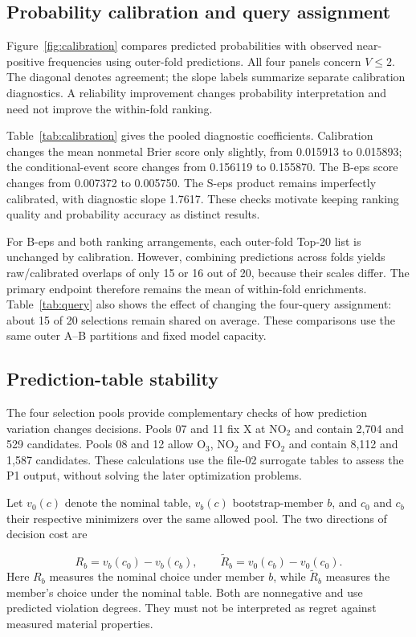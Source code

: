 \subsection{Probability calibration and query assignment}
Figure~\ref{fig:calibration} compares predicted probabilities with observed near-positive frequencies using outer-fold predictions. All four panels concern $V\le2$. The diagonal denotes agreement; the slope labels summarize separate calibration diagnostics. A reliability improvement changes probability interpretation and need not improve the within-fold ranking.

Table~\ref{tab:calibration} gives the pooled diagnostic coefficients. Calibration changes the mean nonmetal Brier score only slightly, from 0.015913 to 0.015893; the conditional-event score changes from 0.156119 to 0.155870. The B-eps score changes from 0.007372 to 0.005750. The S-eps product remains imperfectly calibrated, with diagnostic slope 1.7617. These checks motivate keeping ranking quality and probability accuracy as distinct results.


For B-eps and both ranking arrangements, each outer-fold Top-20 list is unchanged by calibration. However, combining predictions across folds yields raw/calibrated overlaps of only 15 or 16 out of 20, because their scales differ. The primary endpoint therefore remains the mean of within-fold enrichments. Table~\ref{tab:query} also shows the effect of changing the four-query assignment: about 15 of 20 selections remain shared on average. These comparisons use the same outer A--B partitions and fixed model capacity.

\FloatBarrier

\subsection{Prediction-table stability}
The four selection pools provide complementary checks of how prediction variation changes decisions. Pools 07 and 11 fix X at $\mathrm{NO_2}$ and contain 2,704 and 529 candidates. Pools 08 and 12 allow $\mathrm{O_3}$, $\mathrm{NO_2}$ and $\mathrm{FO_2}$ and contain 8,112 and 1,587 candidates. These calculations use the file-02 surrogate tables to assess the P1 output, without solving the later optimization problems.

Let $v_0(c)$ denote the nominal table, $v_b(c)$ bootstrap-member $b$, and $c_0$ and $c_b$ their respective minimizers over the same allowed pool. The two directions of decision cost are
\begin{samepage}
\begin{equation}
 R_b=v_b(c_0)-v_b(c_b),\qquad
 \widetilde R_b=v_0(c_b)-v_0(c_0).
 \label{eq:surrogate-regret}
\end{equation}
\noindent Here $R_b$ measures the nominal choice under member $b$, while $\widetilde R_b$ measures the member's choice under the nominal table. Both are nonnegative and use predicted violation degrees. They must not be interpreted as regret against measured material properties.
\end{samepage}

